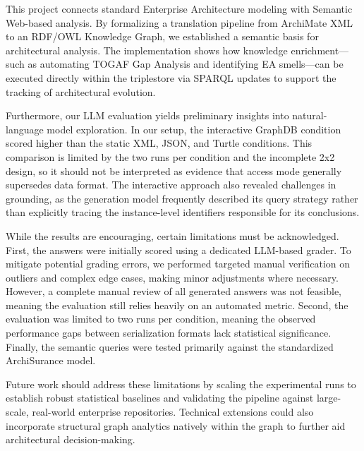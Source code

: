This project connects standard Enterprise Architecture modeling with Semantic Web-based analysis. By formalizing a translation pipeline from ArchiMate XML to an RDF/OWL Knowledge Graph, we established a semantic basis for architectural analysis. The implementation shows how knowledge enrichment---such as automating TOGAF Gap Analysis and identifying EA smells---can be executed directly within the triplestore via SPARQL updates to support the tracking of architectural evolution.

Furthermore, our LLM evaluation yields preliminary insights into natural-language model exploration. In our setup, the interactive GraphDB condition scored higher than the static XML, JSON, and Turtle conditions. This comparison is limited by the two runs per condition and the incomplete 2x2 design, so it should not be interpreted as evidence that access mode generally supersedes data format. The interactive approach also revealed challenges in grounding, as the generation model frequently described its query strategy rather than explicitly tracing the instance-level identifiers responsible for its conclusions.

While the results are encouraging, certain limitations must be acknowledged. First, the answers were initially scored using a dedicated LLM-based grader. To mitigate potential grading errors, we performed targeted manual verification on outliers and complex edge cases, making minor adjustments where necessary. However, a complete manual review of all generated answers was not feasible, meaning the evaluation still relies heavily on an automated metric. Second, the evaluation was limited to two runs per condition, meaning the observed performance gaps between serialization formats lack statistical significance. Finally, the semantic queries were tested primarily against the standardized ArchiSurance model.

Future work should address these limitations by scaling the experimental runs to establish robust statistical baselines and validating the pipeline against large-scale, real-world enterprise repositories. Technical extensions could also incorporate structural graph analytics natively within the graph to further aid architectural decision-making.
